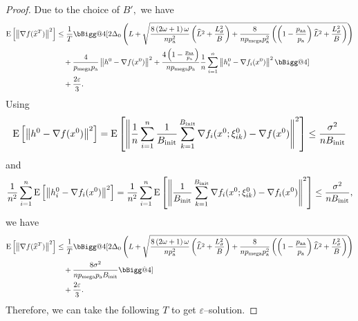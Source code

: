\documentclass{article}
\makeatletter
\newcommand*{\probavailable}{\ensuremath{p_{\textnormal{a}}}}
\newcommand*{\probpairaa}{\ensuremath{p_{\textnormal{aa}}}}
\newcommand*{\probmega}{\ensuremath{p_{\text{mega}}}}
\newcommand{\vast}{\bBigg@{4}}
\makeatother
\begin{document}
\COROLLARYSYNCSTOCHASTIC*

\begin{proof}
  Due to the choice of $B',$ we have
  \begin{align*}
    \Exp{\norm{\nabla f(\widehat{x}^T)}^2} &\leq \frac{1}{T}\vast[2 \Delta_0\left(L + \sqrt{\frac{8 \left(2\omega + 1\right) \omega}{n \probavailable^2}\left(\widehat{L}^2 + \frac{L_{\sigma}^2}{B}\right) + \frac{8}{n \probmega \probavailable^2} \left(\left(1 - \frac{\probpairaa}{\probavailable}\right) \widehat{L}^2 + \frac{L_{\sigma}^2}{B}\right)}\right) \\
    &\quad + \frac{4}{\probmega \probavailable} \norm{h^{0} - \nabla f(x^{0})}^2 + \frac{4 \left(1 - \frac{\probpairaa}{\probavailable}\right)}{n \probmega \probavailable}\frac{1}{n}\sum_{i=1}^n\norm{h^{0}_i - \nabla f_i(x^{0})}^2 \vast] \\
    &\quad + \frac{2 \varepsilon}{3}.
  \end{align*}
  Using 
  \begin{align*}
    {\rm E}\left[\left\| h^{0} - \nabla f(x^{0}) \right\|^2\right] = {\rm E}\left[\left\| \frac{1}{n} \sum_{i=1}^n \frac{1}{B_{\textnormal{init}}} \sum_{k = 1}^{B_{\textnormal{init}}} \nabla f_i(x^0; \xi^0_{ik}) - \nabla f(x^{0}) \right\|^2\right] \leq \frac{\sigma^2}{n B_{\textnormal{init}}}
  \end{align*}
  and 
  \begin{align*}
    \frac{1}{n^2} \sum_{i=1}^n{\rm E}\left[\left\| h^{0}_i - \nabla f_i(x^{0}) \right\|^2\right] = \frac{1}{n^2} \sum_{i=1}^n {\rm E}\left[\left\| \frac{1}{B_{\textnormal{init}}} \sum_{k = 1}^{B_{\textnormal{init}}} \nabla f_i(x^0; \xi^0_{ik}) - \nabla f_i(x^{0}) \right\|^2\right] \leq \frac{\sigma^2}{n B_{\textnormal{init}}},
  \end{align*}
  we have
  \begin{align*}
    \Exp{\norm{\nabla f(\widehat{x}^T)}^2} &\leq \frac{1}{T}\vast[2 \Delta_0\left(L + \sqrt{\frac{8 \left(2\omega + 1\right) \omega}{n \probavailable^2}\left(\widehat{L}^2 + \frac{L_{\sigma}^2}{B}\right) + \frac{8}{n \probmega \probavailable^2} \left(\left(1 - \frac{\probpairaa}{\probavailable}\right) \widehat{L}^2 + \frac{L_{\sigma}^2}{B}\right)}\right) \\
    &\quad + \frac{8 \sigma^2}{n \probmega \probavailable B_{\textnormal{init}}} \vast] \\
    &\quad + \frac{2 \varepsilon}{3}.
  \end{align*}
  Therefore, we can take the following $T$ to get $\varepsilon$--solution.

\end{proof}
\end{document}
